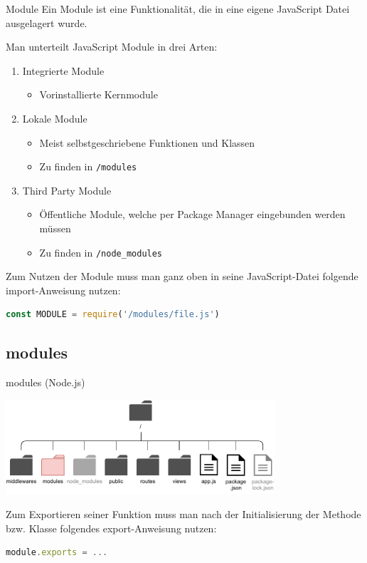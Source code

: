 \begin{defi}{Module}
    Ein Module ist eine Funktionalität, die in eine eigene JavaScript Datei ausgelagert wurde.

    Man unterteilt JavaScript Module in drei Arten:
    \begin{enumerate}
        \item Integrierte Module
              \begin{itemize}
                  \item Vorinstallierte Kernmodule
              \end{itemize}
        \item Lokale Module
              \begin{itemize}
                  \item Meist selbstgeschriebene Funktionen und Klassen
                  \item Zu finden in \texttt{/modules}
              \end{itemize}
        \item Third Party Module
              \begin{itemize}
                  \item Öffentliche Module, welche per Package Manager eingebunden werden müssen
                  \item Zu finden in \texttt{/node\_modules}
              \end{itemize}
    \end{enumerate}

    Zum Nutzen der Module muss man ganz oben in seine JavaScript-Datei folgende import-Anweisung nutzen:
    \begin{lstlisting}[language=JavaScript]
        const MODULE = require('/modules/file.js')
    \end{lstlisting}
\end{defi}

\subsection{modules}

\begin{bonus}{modules (Node.js)}
    \begin{center}
        \includegraphics[width=0.75\textwidth]{includes/figures/bonus_nodejs_module.pdf}
    \end{center}

    Zum Exportieren seiner Funktion muss man nach der Initialisierung der Methode bzw. Klasse folgendes export-Anweisung nutzen:
    \begin{lstlisting}[language=JavaScript]
        module.exports = ...
    \end{lstlisting}
\end{bonus}

